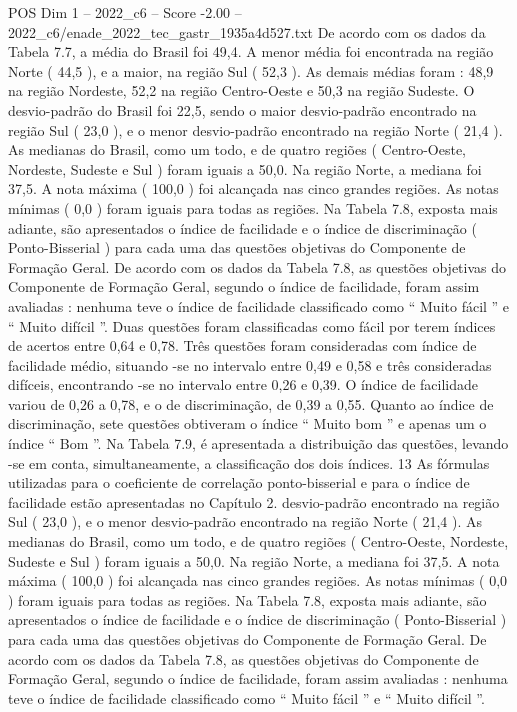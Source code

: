 \begin{textsample}{POS Dim 1 – 2022\_c6 – Score -2.00 – 2022\_c6/enade\_2022\_tec\_gastr\_1935a4d527.txt}
De acordo com os dados da Tabela 7.7, a média do Brasil foi 49,4.
A menor média foi encontrada na região Norte ( 44,5 ), e a maior, na região Sul ( 52,3 ).
As demais médias foram : 48,9 na região Nordeste, 52,2 na região Centro-Oeste e 50,3 na região Sudeste.
O desvio-padrão do Brasil foi 22,5, sendo o maior desvio-padrão encontrado na região Sul ( 23,0 ), e o menor desvio-padrão encontrado na região Norte ( 21,4 ).
As medianas do Brasil, como um todo, e de quatro regiões ( Centro-Oeste, Nordeste, Sudeste e Sul ) foram iguais a 50,0.
Na região Norte, a mediana foi 37,5.
A nota máxima ( 100,0 ) foi alcançada nas cinco grandes regiões.
As notas mínimas ( 0,0 ) foram iguais para todas as regiões.
Na Tabela 7.8, exposta mais adiante, são apresentados o índice de facilidade e o índice de discriminação ( Ponto-Bisserial ) para cada uma das questões objetivas do Componente de Formação Geral.
De acordo com os dados da Tabela 7.8, as questões objetivas do Componente de Formação Geral, segundo o índice de facilidade, foram assim avaliadas : nenhuma teve o índice de facilidade classificado como “ Muito fácil ” e “ Muito difícil ”.
Duas questões foram classificadas como fácil por terem índices de acertos entre 0,64 e 0,78.
Três questões foram consideradas com índice de facilidade médio, situando -se no intervalo entre 0,49 e 0,58 e três consideradas difíceis, encontrando -se no intervalo entre 0,26 e 0,39.
O índice de facilidade variou de 0,26 a 0,78, e o de discriminação, de 0,39 a 0,55.
Quanto ao índice de discriminação, sete questões obtiveram o índice “ Muito bom ” e apenas um o índice “ Bom ”.
Na Tabela 7.9, é apresentada a distribuição das questões, levando -se em conta, simultaneamente, a classificação dos dois índices. 13 As fórmulas utilizadas para o coeficiente de correlação ponto-bisserial e para o índice de facilidade estão apresentadas no Capítulo 2. desvio-padrão encontrado na região Sul ( 23,0 ), e o menor desvio-padrão encontrado na região Norte ( 21,4 ).
As medianas do Brasil, como um todo, e de quatro regiões ( Centro-Oeste, Nordeste, Sudeste e Sul ) foram iguais a 50,0.
Na região Norte, a mediana foi 37,5.
A nota máxima ( 100,0 ) foi alcançada nas cinco grandes regiões.
As notas mínimas ( 0,0 ) foram iguais para todas as regiões.
Na Tabela 7.8, exposta mais adiante, são apresentados o índice de facilidade e o índice de discriminação ( Ponto-Bisserial ) para cada uma das questões objetivas do Componente de Formação Geral.
De acordo com os dados da Tabela 7.8, as questões objetivas do Componente de Formação Geral, segundo o índice de facilidade, foram assim avaliadas : nenhuma teve o índice de facilidade classificado como “ Muito fácil ” e “ Muito difícil ”.

\end{textsample}
